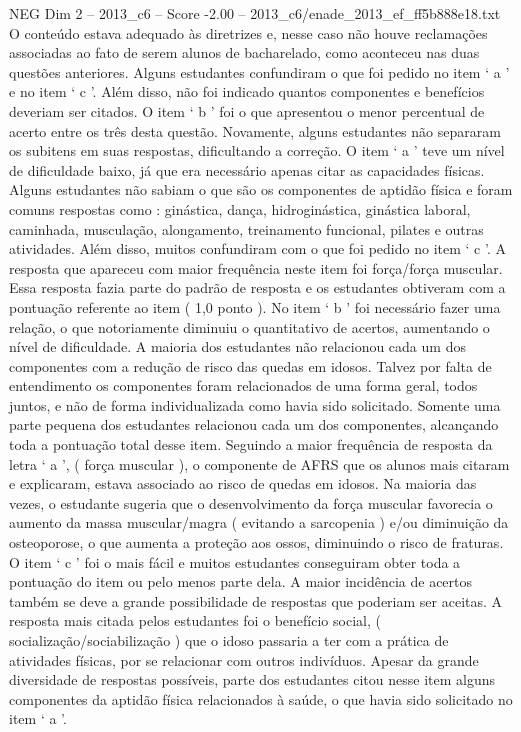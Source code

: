 \begin{textsample}{NEG Dim 2 – 2013\_c6 – Score -2.00 – 2013\_c6/enade\_2013\_ef\_ff5b888e18.txt}
O conteúdo estava adequado às diretrizes e, nesse caso não houve reclamações associadas ao fato de serem alunos de bacharelado, como aconteceu nas duas questões anteriores.
Alguns estudantes confundiram o que foi pedido no item ‘ a ’ e no item ‘ c ’.
Além disso, não foi indicado quantos componentes e benefícios deveriam ser citados.
O item ‘ b ’ foi o que apresentou o menor percentual de acerto entre os três desta questão.
Novamente, alguns estudantes não separaram os subitens em suas respostas, dificultando a correção.
O item ‘ a ’ teve um nível de dificuldade baixo, já que era necessário apenas citar as capacidades físicas.
Alguns estudantes não sabiam o que são os componentes de aptidão física e foram comuns respostas como : ginástica, dança, hidroginástica, ginástica laboral, caminhada, musculação, alongamento, treinamento funcional, pilates e outras atividades.
Além disso, muitos confundiram com o que foi pedido no item ‘ c ’.
A resposta que apareceu com maior frequência neste item foi força/força muscular.
Essa resposta fazia parte do padrão de resposta e os estudantes obtiveram com a pontuação referente ao item ( 1,0 ponto ).
No item ‘ b ’ foi necessário fazer uma relação, o que notoriamente diminuiu o quantitativo de acertos, aumentando o nível de dificuldade.
A maioria dos estudantes não relacionou cada um dos componentes com a redução de risco das quedas em idosos.
Talvez por falta de entendimento os componentes foram relacionados de uma forma geral, todos juntos, e não de forma individualizada como havia sido solicitado.
Somente uma parte pequena dos estudantes relacionou cada um dos componentes, alcançando toda a pontuação total desse item.
Seguindo a maior frequência de resposta da letra ‘ a ’, ( força muscular ), o componente de AFRS que os alunos mais citaram e explicaram, estava associado ao risco de quedas em idosos.
Na maioria das vezes, o estudante sugeria que o desenvolvimento da força muscular favorecia o aumento da massa muscular/magra ( evitando a sarcopenia ) e/ou diminuição da osteoporose, o que aumenta a proteção aos ossos, diminuindo o risco de fraturas.
O item ‘ c ’ foi o mais fácil e muitos estudantes conseguiram obter toda a pontuação do item ou pelo menos parte dela.
A maior incidência de acertos também se deve a grande possibilidade de respostas que poderiam ser aceitas.
A resposta mais citada pelos estudantes foi o benefício social, ( socialização/sociabilização ) que o idoso passaria a ter com a prática de atividades físicas, por se relacionar com outros indivíduos.
Apesar da grande diversidade de respostas possíveis, parte dos estudantes citou nesse item alguns componentes da aptidão física relacionados à saúde, o que havia sido solicitado no item ‘ a ’.

\end{textsample}
